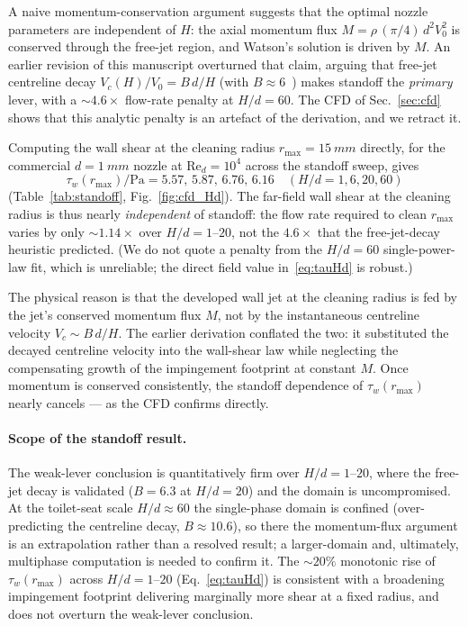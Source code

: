\documentclass[aps,prfluids,reprint,amsmath,amssymb,floatfix]{revtex4-2}
\newcommand{\Rey}{\mathrm{Re}}
\begin{document}
A naive momentum-conservation argument suggests that the optimal nozzle
parameters are independent of $H$: the axial momentum flux
$M = \rho\,(\pi/4)\,d^2 V_0^2$ is conserved through the free-jet region, and
Watson's solution is driven by $M$. An earlier revision of this manuscript
overturned that claim, arguing that free-jet centreline decay
$V_c(H)/V_0 = B\,d/H$ (with $B \approx 6$~\citep{HusseinCappGeorge1994,%
PopeBook}) makes standoff the \emph{primary} lever, with a $\sim 4.6\times$
flow-rate penalty at $H/d = 60$. The CFD of Sec.~\ref{sec:cfd} shows that this
analytic penalty is an artefact of the derivation, and we retract it.

Computing the wall shear at the cleaning radius $r_\mathrm{max} = \SI{15}{mm}$
directly, for the commercial $d = \SI{1}{mm}$ nozzle at $\Rey_d = 10^4$ across
the standoff sweep, gives
\begin{equation}
  \tau_w(r_\mathrm{max})/\mathrm{Pa} = 5.57,\, 5.87,\, 6.76,\, 6.16
  \quad (H/d = 1, 6, 20, 60)
  \label{eq:tauHd}
\end{equation}
(Table~\ref{tab:standoff}, Fig.~\ref{fig:cfd_Hd}). The far-field wall shear at
the cleaning radius is thus nearly \emph{independent} of standoff: the flow
rate required to clean $r_\mathrm{max}$ varies by only $\sim 1.14\times$ over
$H/d = 1$--$20$, not the $4.6\times$ that the free-jet-decay heuristic
predicted. (We do not quote a penalty from the $H/d = 60$ single-power-law
fit, which is unreliable; the direct field value in~\eqref{eq:tauHd} is
robust.)

The physical reason is that the developed wall jet at the cleaning radius is
fed by the jet's conserved momentum flux $M$, not by the instantaneous
centreline velocity $V_c \sim B\,d/H$. The earlier derivation conflated the
two: it substituted the decayed centreline velocity into the wall-shear law
while neglecting the compensating growth of the impingement footprint at
constant $M$. Once momentum is conserved consistently, the standoff dependence
of $\tau_w(r_\mathrm{max})$ nearly cancels --- as the CFD confirms directly.

\paragraph{Scope of the standoff result.}
The weak-lever conclusion is quantitatively firm over $H/d = 1$--$20$, where the
free-jet decay is validated ($B = 6.3$ at $H/d = 20$) and the domain is
uncompromised. At the toilet-seat scale $H/d \approx 60$ the single-phase
domain is confined (over-predicting the centreline decay, $B \approx 10.6$), so
there the momentum-flux argument is an extrapolation rather than a resolved
result; a larger-domain and, ultimately, multiphase computation is needed to
confirm it. The $\sim20\%$ monotonic rise of $\tau_w(r_\mathrm{max})$ across
$H/d = 1$--$20$ (Eq.~\eqref{eq:tauHd}) is consistent with a broadening
impingement footprint delivering marginally more shear at a fixed radius, and
does not overturn the weak-lever conclusion.
\end{document}
